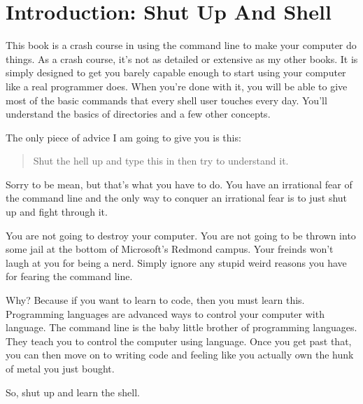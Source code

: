 \chapter*{Introduction: Shut Up And Shell}

This book is a crash course in using the command line to make your computer do things.
As a crash course, it's not as detailed or extensive as my other books.  It is simply
designed to get you barely capable enough to start using your computer like a real
programmer does.  When you're done with it, you will be able to give most of the
basic commands that every shell user touches every day.  You'll understand the basics
of directories and a few other concepts.

The only piece of advice I am going to give you is this:

\begin{quote}
Shut the hell up and type this in then try to understand it.
\end{quote}

Sorry to be mean, but that's what you have to do.  You have an irrational fear
of the command line and the only way to conquer an irrational fear is to just
shut up and fight through it.

You are not going to destroy your computer.  You are not going to be thrown
into some jail at the bottom of Microsoft's Redmond campus.  Your freinds
won't laugh at you for being a nerd.  Simply ignore any stupid weird reasons you have
for fearing the command line.

Why?  Because if you want to learn to code, then you must learn this.  Programming
languages are advanced ways to control your computer with language.  The command line
is the baby little brother of programming languages.  They teach you to control the
computer using language.  Once you get past that, you can then move on to writing
code and feeling like you actually own the hunk of metal you just bought.

So, shut up and learn the shell.

